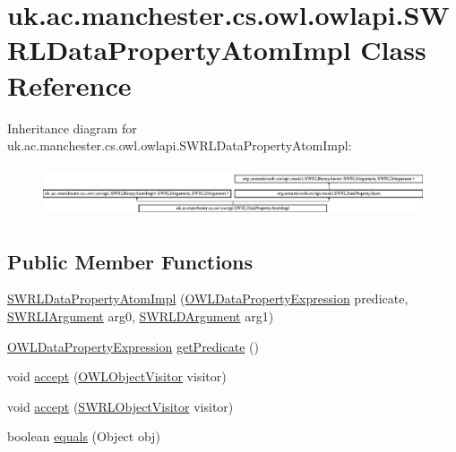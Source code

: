 \hypertarget{classuk_1_1ac_1_1manchester_1_1cs_1_1owl_1_1owlapi_1_1_s_w_r_l_data_property_atom_impl}{\section{uk.\-ac.\-manchester.\-cs.\-owl.\-owlapi.\-S\-W\-R\-L\-Data\-Property\-Atom\-Impl Class Reference}
\label{classuk_1_1ac_1_1manchester_1_1cs_1_1owl_1_1owlapi_1_1_s_w_r_l_data_property_atom_impl}
}
Inheritance diagram for uk.\-ac.\-manchester.\-cs.\-owl.\-owlapi.\-S\-W\-R\-L\-Data\-Property\-Atom\-Impl\-:\begin{figure}[H]
\begin{center}
\leavevmode
\includegraphics[height=1.505376cm]{classuk_1_1ac_1_1manchester_1_1cs_1_1owl_1_1owlapi_1_1_s_w_r_l_data_property_atom_impl}
\end{center}
\end{figure}
\subsection*{Public Member Functions}
\begin{DoxyCompactItemize}
\item 
\hyperlink{classuk_1_1ac_1_1manchester_1_1cs_1_1owl_1_1owlapi_1_1_s_w_r_l_data_property_atom_impl_afe196a5d904a41ec010bdf4f6b4f189d}{S\-W\-R\-L\-Data\-Property\-Atom\-Impl} (\hyperlink{interfaceorg_1_1semanticweb_1_1owlapi_1_1model_1_1_o_w_l_data_property_expression}{O\-W\-L\-Data\-Property\-Expression} predicate, \hyperlink{interfaceorg_1_1semanticweb_1_1owlapi_1_1model_1_1_s_w_r_l_i_argument}{S\-W\-R\-L\-I\-Argument} arg0, \hyperlink{interfaceorg_1_1semanticweb_1_1owlapi_1_1model_1_1_s_w_r_l_d_argument}{S\-W\-R\-L\-D\-Argument} arg1)
\item 
\hyperlink{interfaceorg_1_1semanticweb_1_1owlapi_1_1model_1_1_o_w_l_data_property_expression}{O\-W\-L\-Data\-Property\-Expression} \hyperlink{classuk_1_1ac_1_1manchester_1_1cs_1_1owl_1_1owlapi_1_1_s_w_r_l_data_property_atom_impl_a32b6a0f66d13ef9e74b303dcce69db3a}{get\-Predicate} ()
\item 
void \hyperlink{classuk_1_1ac_1_1manchester_1_1cs_1_1owl_1_1owlapi_1_1_s_w_r_l_data_property_atom_impl_a346b45cbafe653cef4e2c4b904c0cc47}{accept} (\hyperlink{interfaceorg_1_1semanticweb_1_1owlapi_1_1model_1_1_o_w_l_object_visitor}{O\-W\-L\-Object\-Visitor} visitor)
\item 
void \hyperlink{classuk_1_1ac_1_1manchester_1_1cs_1_1owl_1_1owlapi_1_1_s_w_r_l_data_property_atom_impl_a3872ff2966b5518b7561d8b3f6eff6c4}{accept} (\hyperlink{interfaceorg_1_1semanticweb_1_1owlapi_1_1model_1_1_s_w_r_l_object_visitor}{S\-W\-R\-L\-Object\-Visitor} visitor)
\item 
boolean \hyperlink{classuk_1_1ac_1_1manchester_1_1cs_1_1owl_1_1owlapi_1_1_s_w_r_l_data_property_atom_impl_aaa58a71082f9e445179fbaedd1233493}{equals} (Object obj)
\end{DoxyCompactItemize}
